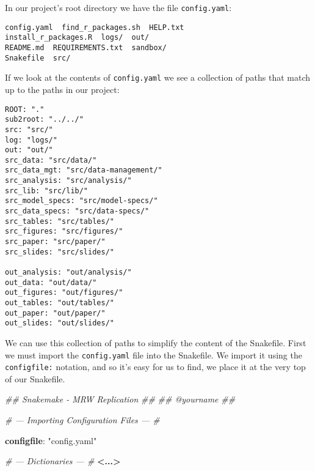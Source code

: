 \documentclass[]{book}
\newenvironment{Shaded}{\begin{snugshade}}{\end{snugshade}}
\newcommand{\KeywordTok}[1]{\textcolor[rgb]{0.13,0.29,0.53}{\textbf{{#1}}}}
\newcommand{\StringTok}[1]{\textcolor[rgb]{0.31,0.60,0.02}{{#1}}}
\newcommand{\CommentTok}[1]{\textcolor[rgb]{0.56,0.35,0.01}{\textit{{#1}}}}
\newcommand{\NormalTok}[1]{{#1}}
\theoremstyle{definition}
\theoremstyle{definition}
\theoremstyle{definition}
\theoremstyle{remark}
\begin{document}
In our project's root directory we have the file \texttt{config.yaml}:

\begin{Shaded}
\end{Shaded}

\begin{verbatim}
config.yaml  find_r_packages.sh  HELP.txt
install_r_packages.R  logs/  out/
README.md  REQUIREMENTS.txt  sandbox/
Snakefile  src/
\end{verbatim}

If we look at the contents of \texttt{config.yaml} we see a collection
of paths that match up to the paths in our project:

\begin{Shaded}
\end{Shaded}

\begin{verbatim}
ROOT: "."
sub2root: "../../"
src: "src/"
log: "logs/"
out: "out/"
src_data: "src/data/"
src_data_mgt: "src/data-management/"
src_analysis: "src/analysis/"
src_lib: "src/lib/"
src_model_specs: "src/model-specs/"
src_data_specs: "src/data-specs/"
src_tables: "src/tables/"
src_figures: "src/figures/"
src_paper: "src/paper/"
src_slides: "src/slides/"

out_analysis: "out/analysis/"
out_data: "out/data/"
out_figures: "out/figures/"
out_tables: "out/tables/"
out_paper: "out/paper/"
out_slides: "out/slides/"
\end{verbatim}

We can use this collection of paths to simplify the content of the
Snakefile. First we must import the \texttt{config.yaml} file into the
Snakefile. We import it using the \texttt{configfile:} notation, and so
it's easy for us to find, we place it at the very top of our Snakefile.

\begin{Shaded}
\begin{Highlighting}[]
\CommentTok{## Snakemake - MRW Replication}
\CommentTok{##}
\CommentTok{## @yourname}
\CommentTok{##}

\CommentTok{# --- Importing Configuration Files --- #}

\KeywordTok{configfile}\NormalTok{: }\StringTok{"config.yaml"}

\CommentTok{# --- Dictionaries --- #}
\KeywordTok{<...>}
\end{Highlighting}
\end{Shaded}
\end{document}
